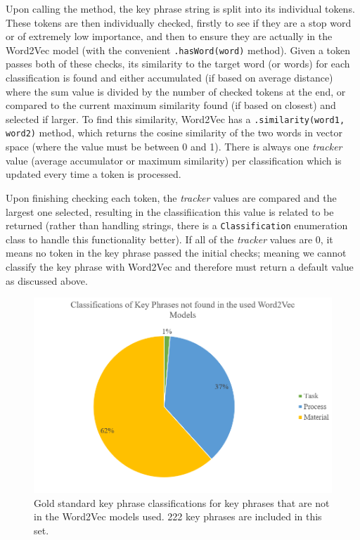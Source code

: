 Upon calling the method, the key phrase string is split into its individual tokens. These tokens are then individually checked, firstly to see if they are a stop word or of extremely low importance, and then to ensure they are actually in the Word2Vec model (with the convenient \texttt{.hasWord(word)} method). Given a token passes both of these checks, its similarity to the target word (or words) for each classification is found and either accumulated (if based on average distance) where the sum value is divided by the number of checked tokens at the end, or compared to the current maximum similarity found (if based on closest) and selected if larger. To find this similarity, Word2Vec has a \texttt{.similarity(word1, word2)} method, which returns the cosine similarity of the two words in vector space (where the value must be between 0 and 1). There is always one \textit{tracker} value (average accumulator or maximum similarity) per classification which is updated every time a token is processed.

Upon finishing checking each token, the \textit{tracker} values are compared and the largest one selected, resulting in the classifiication this value is related to be returned (rather than handling strings, there is a \texttt{Classification} enumeration class to handle this functionality better). If all of the \textit{tracker} values are 0, it means no token in the key phrase passed the initial checks; meaning we cannot classify the key phrase with Word2Vec and therefore must return a default value as discussed above.

\begin{center}
	\begin{figure}
		\includegraphics[width=\textwidth]{img/w2vbadtokensclasses.png}
		\caption[Key Phrase Classifications not in Word2Vec Model]{Gold standard key phrase classifications for key phrases that are not in the Word2Vec models used. 222 key phrases are included in this set.}
		\label{figure:w2vbadtokensclasses}
	\end{figure}
\end{center}

